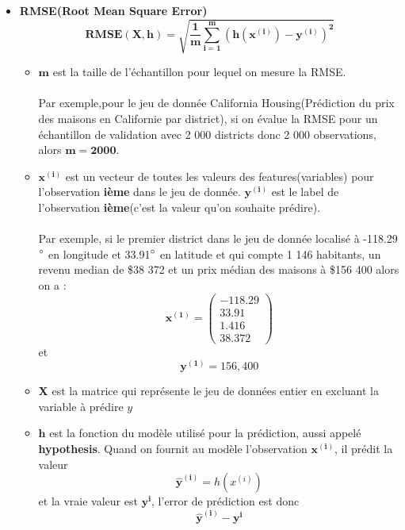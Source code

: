 \documentclass[french]{article}
\begin{document}
	\begin{itemize}[label=\textbullet, font=\LARGE \color{red}]
		\item \textbf{RMSE(Root Mean Square Error)}
		$$\bm{RMSE(X,h)=\sqrt{\frac{1}{m}\sum_{i=1}^{m}(h(x^{(i)})-y^{(i)})^{2}}}$$
		\begin{itemize}[label=\textbullet]
			\item $\bm{m}$ est la taille de l'échantillon pour lequel on mesure la RMSE.\\\\
			Par exemple,pour le jeu de donnée California Housing(Prédiction du prix des maisons en Californie par district), si on évalue la RMSE pour un échantillon de validation avec 2 000 districts donc 2 000 observations, alors $\bm{m=2 000}$.
			
			\item $\bm{x^{(i)}}$ est un vecteur de toutes les valeurs des features(variables) pour l'observation \textbf{ième} dans le jeu de donnée. $\bm{y^{(i)}}$ est le label de l'observation \textbf{ième}(c'est la valeur qu'on souhaite prédire).\\\\
			Par exemple, si le premier district dans le jeu de donnée localisé à -118.29$\degree$ en longitude et 33.91$\degree$ en latitude et qui compte 1 146 habitants, un revenu median de \$38 372 et un prix médian des maisons à \$156 400 alors on a :
			$$\bm{x^{(1)}}=\left( \begin{array}{c}
			-118.29 \\
			33.91 \\
			1.416 \\
			38.372
			\end{array} \right)$$
			et
			$$\bm{y^{(1)}}=156,400$$
			
			\item \textbf{X} est la matrice qui représente le jeu de données entier en excluant la variable à prédire $y$
			
			\item $\bm{h}$ est la fonction du modèle utilisé pour la prédiction, aussi appelé \textbf{hypothesis}. Quand on fournit au modèle l'observation $\bm{x^{(i)}}$, il prédit la valeur $$\bm{\hat{y}^{(i)}}=h(x^{(i)})$$
			et la vraie valeur est $\bm{y^{i}}$, l'error de prédiction est donc $$\bm{\hat{y}^{(i)}-y^{i}}$$
			

\end{itemize}
\end{itemize}
\end{document}
